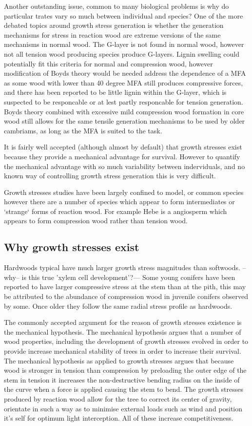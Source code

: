 \documentclass{article}
\begin{document}
Another outstanding issue, common to many biological problems is why do
particular trates vary so much between individual and species? One of the
more debated topics around growth stress generation is whether the generation
mechanisms for stress in reaction wood are extreme versions of the same
mechanisms in normal wood. The G-layer is not found in normal wood, however not
all tension wood producing species produce G-layers. Lignin swelling could
potentially fit this criteria for normal and compression wood, however
modification of Boyds theory would be needed address the dependence of a MFA
as some wood with lower than 40 degree MFA still produces compressive forces,
and there has been reported to be little lignin within the G-layer, which is
suspected to be responcable or at lest partly responcable for tension
generation. Boyds theory combined with excessive mild compression wood
formation in core wood still allows for the same tensile generation mechanisms
to be used by older cambriams, as long as the MFA is suited to the task.

It is fairly well accepted (although almost by default) that growth stresses
exist because they provide a mechanical advantage for survival. However to
quantify the mechanical advantage with so much variability between inderviduals,
and no known way of controlling growth stress generation this is very difficult.

Growth stresses studies have been largely confined to model, or common species
however there are a number of species which appear to form intermediates or
`strange` forms of reaction wood. For example Hebe is a angiosperm which appears
to form compression wood rather than tension wood.

\subsection{Why growth stresses exist}
Hardwoods typical have much larger growth stress magnitudes than softwoods.
--why-- is this true 'xylem cell development'?--- Some young conifers have been
reported to have larger compressive stress at the stem than at the pith,
this may be attributed to the abundance of compression wood in juvenile
conifers observed by some. Once older they follow the same radial stress profile
as hardwoods.

The commonly accepted argument for the reason of growth stresses existence is
the mechanical hypothesis. The mechanical hypothesis argues that a number of wood
properties, including the development of growth stresses evolved in order to
provide increase mechanical stability of trees in order to increase their
survival. The mechanical hypothesis as applied to growth stresses argues that
because wood is stronger in tension than compression by preloading the outer
edge of the stem in tension it increases the non-destructive bending radius on
the inside of the curve when a force is applied causing the stem to bend.
The growth stresses produced by reaction wood allow for the tree to correct its
center of gravity, orientate in such a way as to minimise external loads such as
wind and position it's self for optimum light interception. All of these
increase competitiveness.
\end{document}
